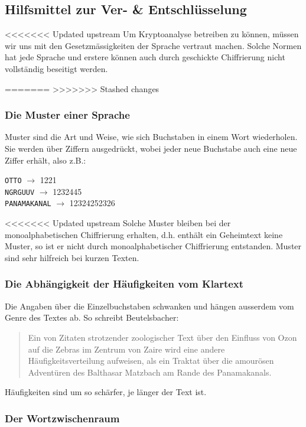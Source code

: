 \documentclass[%
<<<<<<< Updated upstream
11pt,%
twoside,%
titlepage,%
german,%
headsepline%
]{scrartcl}
\begin{document}
\subsection{Hilfsmittel zur Ver- \& Entschlüsselung}

<<<<<<< Updated upstream
Um Kryptoanalyse betreiben zu k\"onnen, müssen wir uns mit den Gesetzmässigkeiten der Sprache vertraut machen. Solche Normen hat jede Sprache und erstere k\"onnen auch durch geschickte Chiffrierung nicht vollständig beseitigt werden.

=======
>>>>>>> Stashed changes
\subsubsection{Die Muster einer Sprache}

Muster sind die Art und Weise, wie sich Buchstaben in einem Wort wiederholen. Sie werden über Ziffern ausgedrückt, wobei jeder neue Buchstabe auch eine neue Ziffer erhält, also z.B.:
\begin{center}
\texttt{OTTO} $\longrightarrow$ 1221\\
\texttt{NGRGUUV} $\longrightarrow$ 1232445\\
\texttt{PANAMAKANAL} $\longrightarrow$ 12324252326
\end{center}
<<<<<<< Updated upstream
Solche Muster bleiben bei der monoalphabetischen Chiffrierung erhalten, d.h. enthält ein Geheimtext keine Muster, so ist er nicht durch monoalphabetischer Chiffrierung entstanden. Muster sind sehr hilfreich bei kurzen Texten.

\subsubsection{Die Abhängigkeit der Häufigkeiten vom Klartext}

Die Angaben über die Einzelbuchstaben schwanken und hängen ausserdem vom Genre des Textes ab. So schreibt Beutelsbacher:

\begin{quote}
\glqq Ein von Zitaten strotzender zoologischer Text über den Einfluss von Ozon auf die Zebras im Zentrum von Zaire wird eine andere Häufigkeitsverteilung aufweisen, als ein Traktat über die amourösen Adventüren des Balthasar Matzbach am Rande des Panamakanals.\grqq
\end{quote}

Häufigkeiten sind um so schärfer, je länger der Text ist.

\subsubsection{Der Wortzwischenraum}
\end{document}
